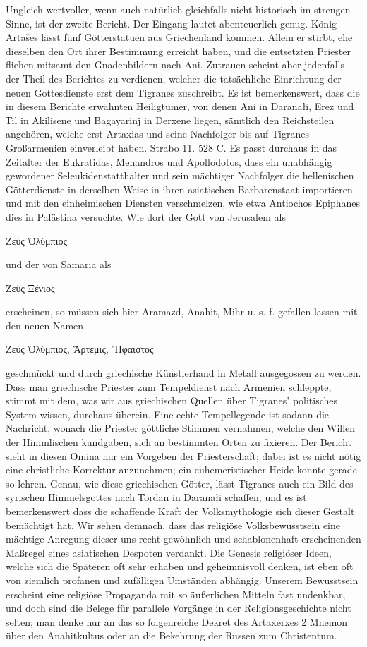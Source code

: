 \documentclass{article}
\begin{document}
Ungleich wertvoller, wenn auch natürlich gleichfalls nicht historisch im strengen Sinne, ist der zweite Bericht. Der Eingang lautet abenteuerlich genug. König Artašēs lässt fünf Götterstatuen aus Griechenland kommen. Allein er stirbt, ehe dieselben den Ort ihrer Bestimmung erreicht haben, und die entsetzten Priester fliehen mitsamt den Gnadenbildern nach Ani. Zutrauen scheint aber jedenfalls der Theil des Berichtes zu verdienen, welcher die tatsächliche Einrichtung der neuen Gottesdienste erst dem Tigranes zuschreibt. Es ist bemerkenswert, dass die in diesem Berichte erwähnten Heiligtümer, von denen Ani in Daranałi, Erēz und T͑il in Akilisene und Bagayarinǰ in Derxene liegen, sämtlich den Reichsteilen angehören, welche erst Artaxias und seine Nachfolger bis auf Tigranes Großarmenien einverleibt haben. Strabo 11. 528 C. Es passt durchaus in das Zeitalter der Eukratidas, Menandros und Apollodotos, dass ein unabhängig gewordener Seleukidenstatthalter und sein mächtiger Nachfolger die hellenischen Götterdienste in derselben Weise in ihren asiatischen Barbarenstaat importieren und mit den einheimischen Diensten verschmelzen, wie etwa Antiochos Epiphanes dies in Palästina versuchte. Wie dort der Gott von Jerusalem als \begin{greek}Ζεὺς Ὀλύμπιος\end{greek} und der von Samaria als \begin{greek}Ζεὺς Ξένιος\end{greek} erscheinen, so müssen sich hier Aramazd, Anahit, Mihr u. s. f. gefallen lassen mit den neuen Namen \begin{greek}Ζεὺς Ὀλύμπιος, Ἄρτεμις, Ἥφαιστος\end{greek} geschmückt und durch griechische Künstlerhand in Metall ausgegossen zu werden. Dass man griechische Priester zum Tempeldienst nach Armenien schleppte, stimmt mit dem, was wir aus griechischen Quellen über Tigranes' politisches System wissen, durchaus überein. Eine echte Tempellegende ist sodann die Nachricht, wonach die Priester göttliche Stimmen vernahmen, welche den Willen der Himmlischen kundgaben, sich an bestimmten Orten zu fixieren. Der Bericht sieht in diesen Omina nur ein Vorgeben der Priesterschaft; dabei ist es nicht nötig eine christliche Korrektur anzunehmen; ein euhemeristischer Heide konnte gerade so lehren. Genau, wie diese griechischen Götter, lässt Tigranes auch ein Bild des syrischen Himmelsgottes nach T͑ordan in Daranałi schaffen, und es ist bemerkenswert dass die schaffende Kraft der Volksmythologie sich dieser Gestalt bemächtigt hat. Wir sehen demnach, dass das religiöse Volksbewusstsein eine mächtige Anregung dieser uns recht gewöhnlich und schablonenhaft erscheinenden Maßregel eines asiatischen Despoten verdankt. Die Genesis religiöser Ideen, welche sich die Späteren oft sehr erhaben und geheimnisvoll denken, ist eben oft von ziemlich profanen und zufälligen Umständen abhängig. Unserem Bewusstsein erscheint eine religiöse Propaganda mit so äußerlichen Mitteln fast undenkbar, und doch sind die Belege für parallele Vorgänge in der Religionsgeschichte nicht selten; man denke nur an das so folgenreiche Dekret des Artaxerxes 2 Mnemon über den Anahitkultus oder an die Bekehrung der Russen zum Christentum.
\end{document}
